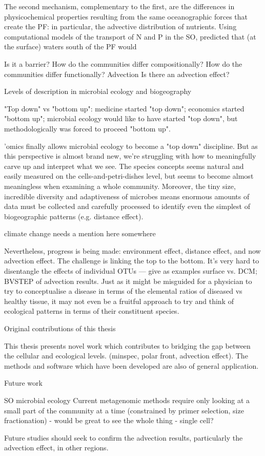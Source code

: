 The second mechanism, complementary to the first, are the differences in physicochemical properties resulting from the same oceanographic forces that create the \ac{PF}: in particular, the advective distribution of nutrients.
Using computational models of the transport of N and P in the \ac{SO}, \citet{Weber:2010fi} predicted that (at the surface) waters south of the \ac{PF} would 



Is it a barrier?
How do the communities differ compositionally?
How do the communities differ functionally?
Advection
Is there an advection effect?

Levels of description in microbial ecology and biogeography

"Top down" vs "bottom up": medicine started "top down"; economics started "bottom up"; microbial ecology would like to have started "top down", but methodologically was forced to proceed "bottom up".

'omics finally allows microbial ecology to become a "top down" discipline. But as this perspective is almost brand new, we're struggling with how to meaningfully carve up and interpret what we see. The species concepts seems natural and easily measured on the cells-and-petri-dishes level, but seems to become almost meaningless when examining a whole community. Moreover, the tiny size, incredible diversity and adaptiveness of microbes means enormous amounts of data must be collected and carefully processed to identify even the simplest of biogeographic patterns (e.g. distance effect).

climate change needs a mention here somewhere

Nevertheless, progress is being made: environment effect, distance effect, and now advection effect. The challenge is linking the top to the bottom. It's very hard to disentangle the effects of individual OTUs — give as examples surface vs. DCM; BVSTEP of advection results. Just as it might be misguided for a physician to try to conceptualise a disease in terms of the elemental ratios of diseased vs healthy tissue, it may not even be a fruitful approach to try and think of ecological patterns in terms of their constituent species.

Original contributions of this thesis

This thesis presents novel work which contributes to bridging the gap between the cellular and ecological levels. (minspec, polar front, advection effect). The methods and software which have been developed are also of general application.

Future work

SO microbial ecology
Current metagenomic methods require only looking at a small part of the community at a time (constrained by primer selection, size fractionation) - would be great to see the whole thing - single cell?


Future studies should seek to confirm the advection results, particularly the advection effect, in other regions.
